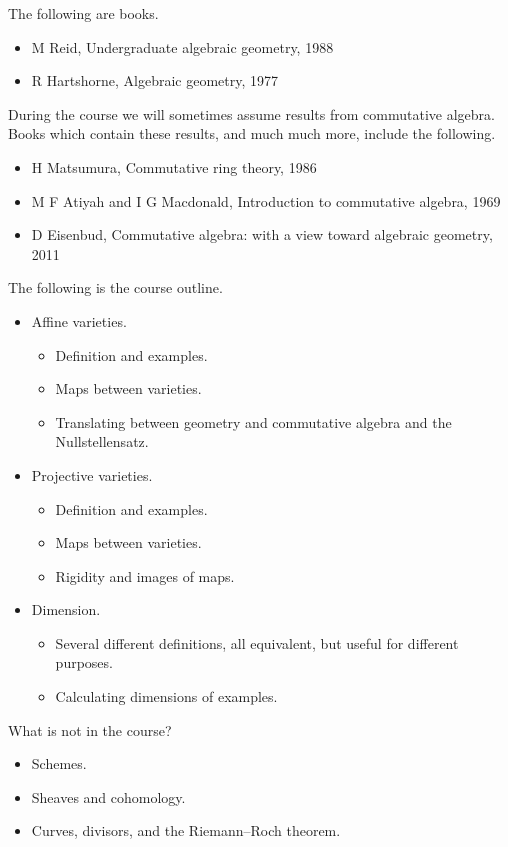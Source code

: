 The following are books.
\begin{itemize}
\item M Reid, Undergraduate algebraic geometry, 1988
\item R Hartshorne, Algebraic geometry, 1977
\end{itemize}
During the course we will sometimes assume results from commutative algebra. Books which contain these results, and much much more, include the following.
\begin{itemize}
\item H Matsumura, Commutative ring theory, 1986
\item M F Atiyah and I G Macdonald, Introduction to commutative algebra, 1969
\item D Eisenbud, Commutative algebra: with a view toward algebraic geometry, 2011
\end{itemize}
The following is the course outline.
\begin{itemize}
\item Affine varieties.
\begin{itemize}
\item Definition and examples.
\item Maps between varieties.
\item Translating between geometry and commutative algebra and the Nullstellensatz.
\end{itemize}
\item Projective varieties.
\begin{itemize}
\item Definition and examples.
\item Maps between varieties.
\item Rigidity and images of maps.
\end{itemize}
\item Dimension.
\begin{itemize}
\item Several different definitions, all equivalent, but useful for different purposes.
\item Calculating dimensions of examples.
\end{itemize}
\end{itemize}
What is not in the course?
\begin{itemize}
\item Schemes.
\item Sheaves and cohomology.
\item Curves, divisors, and the Riemann–Roch theorem.
\end{itemize}

